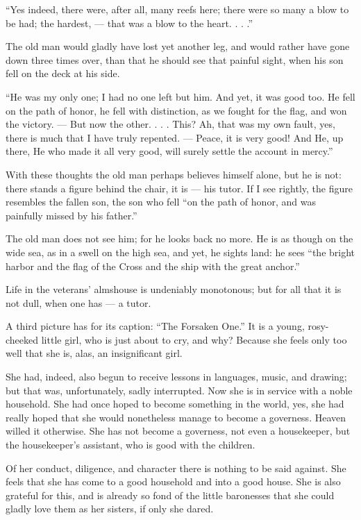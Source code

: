 \documentclass[12pt,a4paper]{book}
\begin{document}
``Yes indeed, there were, after all, many reefs here; there were so many a blow to be had; the hardest, --- that was a blow to the heart. . . .''

The old man would gladly have lost yet another leg, and would rather have gone down three times over, than that he should see that painful sight, when his son fell on the deck at his side.

``He was my only one; I had no one left but him. And yet, it was good too. He fell on the path of honor, he fell with distinction, as we fought for the flag, and won the victory. --- But now the other. . . . This? Ah, that was my own fault, yes, there is much that I have truly repented. --- Peace, it is very good! And He, up there, He who made it all very good, will surely settle the account in mercy.''

With these thoughts the old man perhaps believes himself alone, but he is not: there stands a figure behind the chair, it is --- his tutor. If I see rightly, the figure resembles the fallen son, the son who fell ``on the path of honor, and was painfully missed by his father.''

The old man does not see him; for he looks back no more. He is as though on the wide sea, as in a swell on the high sea, and yet, he sights land: he sees ``the bright harbor and the flag of the Cross and the ship with the great anchor.''

Life in the veterans' almshouse is undeniably monotonous; but for all that it is not dull, when one has --- a tutor.

A third picture has for its caption: ``The Forsaken One.''
It is a young, rosy-cheeked little girl, who is just about to cry, and why? Because she feels only too well that she is, alas, an insignificant girl.

She had, indeed, also begun to receive lessons in languages, music, and drawing; but that was, unfortunately, sadly interrupted. Now she is in service with a noble household. She had once hoped to become something in the world, yes, she had really hoped that she would nonetheless manage to become a governess. Heaven willed it otherwise. She has not become a governess, not even a housekeeper, but the housekeeper's assistant, who is good with the children.

Of her conduct, diligence, and character there is nothing to be said against. She feels that she has come to a good household and into a good house. She is also grateful for this, and is already so fond of the little baronesses that she could gladly love them as her sisters, if only she dared.
\end{document}
